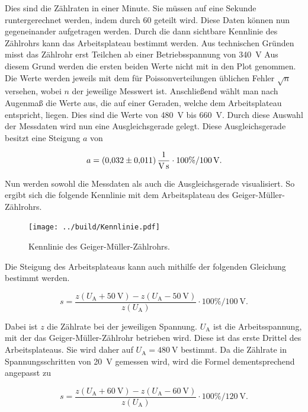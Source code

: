 \noindent Dies sind die Zählraten in einer Minute. Sie müssen auf eine Sekunde runtergerechnet werden, indem durch 60 geteilt wird. 
Diese Daten können nun gegeneinander aufgetragen werden. Durch die dann sichtbare Kennlinie 
des Zählrohrs kann das Arbeitsplateau bestimmt werden. 
Aus technischen Gründen misst das Zählrohr erst Teilchen ab einer Betriebsspannung von \qty{340}{\volt} 
Aus diesem Grund werden die ersten beiden Werte nicht mit in den Plot genommen.
Die Werte werden jeweils mit dem für Poissonverteilungen üblichen Fehler $\sqrt{n}$ versehen, wobei $n$ 
der jeweilige Messwert ist.
Anschließend wählt man nach Augenmaß die Werte aus, die auf einer Geraden, welche dem Arbeitsplateau 
entspricht, liegen. Dies sind die Werte von \qty{480}{\volt} bis \qty{660}{\volt}. Durch diese Auswahl 
der Messdaten wird nun eine Ausgleichsgerade gelegt. Diese Ausgleichsgerade besitzt eine Steigung $a$ von

\begin{align*}
    a = \qty{0.032\pm0.011}{\per \volt \per \second} \cdot 100\% / \qty{100}{\volt}. 
\end{align*}

\noindent Nun werden sowohl die Messdaten als auch die Ausgleichsgerade visualisiert.
So ergibt sich die folgende Kennlinie mit dem Arbeitsplateau des Geiger-Müller-Zählrohrs.

\begin{figure}[H]
    \centering
    \texttt{[image: ../build/Kennlinie.pdf]}
    \caption{Kennlinie des Geiger-Müller-Zählrohrs.}
\end{figure}

\noindent Die Steigung des Arbeitsplateaus kann auch mithilfe der folgenden Gleichung bestimmt werden.

\begin{equation*}
    s = \frac{z(U_\text{A} + \qty{50}{\volt}) - z(U_\text{A} - \qty{50}{\volt}) } { z(U_\text{A}) } \cdot 100\% / \qty{100}{\volt}.
\end{equation*}

\noindent Dabei ist $z$ die Zählrate bei der jeweiligen Spannung. $U_\text{A}$ ist die Arbeitsspannung, mit der 
das Geiger-Müller-Zählrohr betrieben wird. Diese ist das erste Drittel des Arbeitsplateaus. Sie wird daher 
auf $U_\text{A} = \qty{480}{\volt}$ bestimmt. Da die Zählrate in Spannungsschritten von \qty{20}{\volt} gemessen 
wird, wird die Formel dementsprechend angepasst zu  

\begin{equation*}
    s = \frac{z(U_\text{A} + \qty{60}{\volt}) - z(U_\text{A} - \qty{60}{\volt}) } { z(U_\text{A}) } \cdot 100\% / \qty{120}{\volt}.
\end{equation*}

